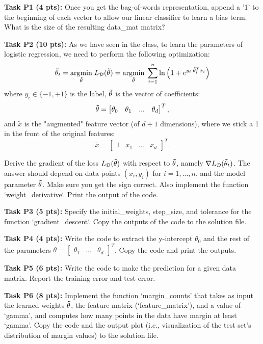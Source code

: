 \documentclass[12pt]{article}
\begin{document}
\textbf{Task P1 (4 pts):} Once you get the bag-of-words representation, append a '1' to the beginning of each vector to allow our linear classifier to learn a bias term. What is the size of the resulting data\_mat matrix?

\textbf{Task P2 (10 pts):}  As we have seen in the class, to learn the parameters of logistic regression, we need to perform the following optimization:
$$
{\bf \tilde\theta}_t =
\underset{{\bf \tilde\theta}}{\operatorname{argmin}} \; L_\mathcal{D}({\bf \tilde\theta}) =
\underset{{\bf \tilde\theta}}{\operatorname{argmin}} \;\sum_{i=1}^{n} \ln \left( 1 + e^{y_i \; {\bf \tilde\theta}_t^T {\tilde x}_i} \right)
$$
where $y_i\in\{-1,+1\}$ is the label, ${\bf \tilde\theta}$ is the vector of coefficients:
$$
{\bf \tilde\theta} = \begin{bmatrix} \theta_0 & \theta_1 & ... & \theta_d \end{bmatrix}^T,
$$
and ${\tilde x}$ is the "augmented" feature vector (of $d+1$ dimensions), where we stick a 1 in the front of the original features:
$$
{\tilde x} = \begin{bmatrix} 1 & x_1 & ... & x_d \end{bmatrix}^T.
$$

Derive the gradient of the loss $L_\mathcal{D}({\bf \tilde\theta})$ with respect to ${\bf \tilde\theta}$, namely $\nabla L_\mathcal{D}({\bf \tilde\theta}_t)$. The answer should depend on data points $(x_i,y_i)$ for $i=1,...,n$, and the model parameter ${\bf \tilde\theta}$. Make sure you get the sign correct. Also implement the function `weight\_derivative`. Print the output of the code. 

\textbf{Task P3 (5 pts):} Specify the initial\_weights, step\_size, and tolerance for the function `gradient\_descent`. Copy the outputs of the code to the solution file.

\textbf{Task P4  (4 pts):} Write the code to extract the y-intercept $\theta_0$ and the rest of the parameters $\theta= \begin{bmatrix} \theta_1 & ... & \theta_d \end{bmatrix}^T$. Copy the code and print the outputs.

\textbf{Task P5 (6 pts):} Write the code to make the prediction for a given data matrix. Report the training error and test error.

\textbf{Task P6 (8 pts):} Implement the function `margin\_counts' that takes as input the learned weights $\bf\tilde\theta$, the feature matrix (`feature\_matrix'), and a value of `gamma', and computes how many points in the data have margin at least `gamma'. Copy the code and the output plot (i.e., visualization of the test set's distribution of margin values) to the solution file.
\end{document}
